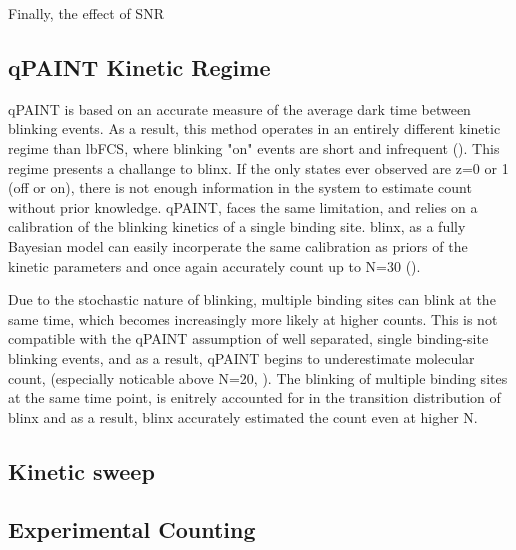 Finally, the effect of SNR

\subsection{qPAINT Kinetic Regime}
qPAINT is based on an accurate measure of the average dark time between blinking events. 
	As a result, this method operates in an entirely different kinetic regime than lbFCS, where blinking 
	"on" events are short and infrequent ().
	This regime presents a challange to blinx. If the only states ever observed are z=0 or 1 (off or on),
	there is not enough information in the system to estimate count without prior knowledge.
	qPAINT, faces the same limitation, and relies on a calibration of the blinking kinetics of a single binding site.
	blinx, as a fully Bayesian model can easily incorperate the same calibration as priors of the kinetic parameters
	and once again accurately count up to N=30 ().

Due to the stochastic nature of blinking, multiple binding sites can blink at the same time, 
	which becomes increasingly more likely at higher counts.
	This is not compatible with the qPAINT assumption of well separated, single binding-site blinking events, 
	and as a result, qPAINT begins to underestimate molecular count, (especially noticable above N=20, ). 
	The blinking of multiple binding sites at the same time point, 
	is enitrely accounted for in the transition distribution of blinx 
	and as a result, blinx accurately estimated the count even at higher N.
	

\subsection{Kinetic sweep}


\subsection{Experimental Counting}
